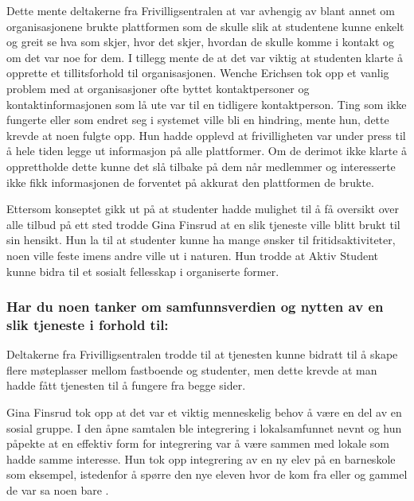 Dette mente deltakerne fra Frivilligsentralen at var avhengig av blant annet om organisasjonene brukte plattformen som de skulle slik at studentene kunne enkelt og greit se hva som skjer, hvor det skjer, hvordan de skulle komme i kontakt og om det var noe for dem. I tillegg mente de at det var viktig at studenten klarte å opprette et tillitsforhold til organisasjonen. Wenche Erichsen tok opp et vanlig problem med at organisasjoner ofte byttet kontaktpersoner og kontaktinformasjonen som lå ute var til en tidligere kontaktperson. Ting som ikke fungerte eller som endret seg i systemet ville bli en hindring, mente hun, dette krevde at noen fulgte opp. Hun hadde opplevd at frivilligheten var under press til å hele tiden legge ut informasjon på alle plattformer. Om de derimot ikke klarte å opprettholde dette kunne det slå tilbake på dem når medlemmer og interesserte ikke fikk informasjonen de forventet på akkurat den plattformen de brukte. \cite{FRIVILLIGSENTRALEN-INTERVJU:21}

Ettersom konseptet gikk ut på at studenter hadde mulighet til å få oversikt over alle tilbud på ett sted trodde Gina Finsrud at en slik tjeneste ville blitt brukt til sin hensikt. Hun la til at studenter kunne ha mange ønsker til fritidsaktiviteter, noen ville feste imens andre ville ut i naturen. Hun trodde at Aktiv Student kunne bidra til et sosialt fellesskap i organiserte former. \cite{KOMMUNEN-INTERVJU:20}

\setlength{\leftskip}{0pt}

\subsubsection{Har du noen tanker om samfunnsverdien og nytten av en slik tjeneste i forhold til:}

\setlength{\leftskip}{2em}
Deltakerne fra Frivilligsentralen trodde til at tjenesten kunne bidratt til å skape flere møteplasser mellom fastboende og studenter, men dette krevde at man hadde fått tjenesten til å fungere fra begge sider. \cite{FRIVILLIGSENTRALEN-INTERVJU:21}

Gina Finsrud tok opp at det var et viktig menneskelig behov å være en del av en sosial gruppe. I den åpne samtalen ble integrering i lokalsamfunnet nevnt og hun påpekte at en effektiv form for integrering var å være sammen med lokale som hadde samme interesse. Hun tok opp integrering av en ny elev på en barneskole som eksempel, istedenfor å spørre den nye eleven hvor de kom fra eller og gammel de var sa noen bare . \cite{KOMMUNEN-INTERVJU:20}


